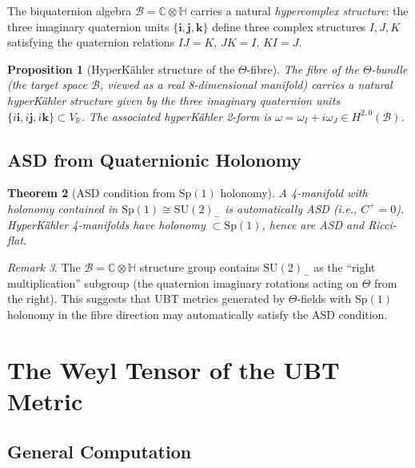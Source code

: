 \documentclass[11pt,a4paper]{article}
\newtheorem{theorem}{Theorem}[section]
\newtheorem{proposition}[theorem]{Proposition}
\theoremstyle{definition}
\theoremstyle{remark}
\newtheorem{remark}[theorem]{Remark}
\begin{document}
The biquaternion algebra $\mathcal{B} = \mathbb{C}\otimes\mathbb{H}$ carries a
natural \emph{hypercomplex structure}: the three imaginary quaternion units
$\{\mathbf{i},\mathbf{j},\mathbf{k}\}$ define three complex structures
$I, J, K$ satisfying the quaternion relations $IJ = K$, $JK = I$, $KI = J$.

\begin{proposition}[HyperKähler structure of the $\Theta$-fibre]
\label{prop:hyperkahler}
The fibre of the $\Theta$-bundle (the target space $\mathcal{B}$, viewed as a
real 8-dimensional manifold) carries a natural hyperKähler structure given by
the three imaginary quaternion units $\{i\mathbf{i},i\mathbf{j},i\mathbf{k}\}
\subset V_\mathbb{R}$.  The associated hyperKähler 2-form is
$\omega = \omega_I + i\omega_J \in H^{2,0}(\mathcal{B})$.
\end{proposition}

\subsection{ASD from Quaternionic Holonomy}

\begin{theorem}[ASD condition from $\mathrm{Sp}(1)$ holonomy]
\label{thm:asd}
A 4-manifold with holonomy contained in $\mathrm{Sp}(1) \cong \mathrm{SU}(2)_-$
is automatically ASD (i.e., $C^+ = 0$).  HyperKähler 4-manifolds have holonomy
$\subset \mathrm{Sp}(1)$, hence are ASD and Ricci-flat.
\end{theorem}

\begin{remark}
The $\mathcal{B} = \mathbb{C}\otimes\mathbb{H}$ structure group contains
$\mathrm{SU}(2)_-$ as the ``right multiplication'' subgroup (the quaternion
imaginary rotations acting on $\Theta$ from the right).  This suggests that
UBT metrics generated by $\Theta$-fields with $\mathrm{Sp}(1)$ holonomy in
the fibre direction may automatically satisfy the ASD condition.
\end{remark}

\section{The Weyl Tensor of the UBT Metric}
\label{sec:weyl}

\subsection{General Computation}
\end{document}
